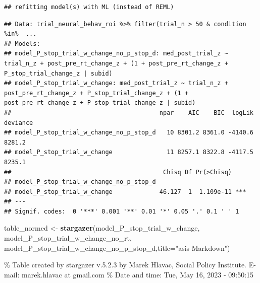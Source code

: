 \documentclass[
]{article}
\newenvironment{Shaded}{\begin{snugshade}}{\end{snugshade}}
\newcommand{\DataTypeTok}[1]{\textcolor[rgb]{0.13,0.29,0.53}{#1}}
\newcommand{\KeywordTok}[1]{\textcolor[rgb]{0.13,0.29,0.53}{\textbf{#1}}}
\newcommand{\NormalTok}[1]{#1}
\newcommand{\StringTok}[1]{\textcolor[rgb]{0.31,0.60,0.02}{#1}}
\begin{document}
\begin{verbatim}
## refitting model(s) with ML (instead of REML)
\end{verbatim}

\begin{verbatim}
## Data: trial_neural_behav_roi %>% filter(trial_n > 50 & condition %in%  ...
## Models:
## model_P_stop_trial_w_change_no_p_stop_d: med_post_trial_z ~ trial_n_z + post_pre_rt_change_z + (1 + post_pre_rt_change_z + P_stop_trial_change_z | subid)
## model_P_stop_trial_w_change: med_post_trial_z ~ trial_n_z + post_pre_rt_change_z + P_stop_trial_change_z + (1 + post_pre_rt_change_z + P_stop_trial_change_z | subid)
##                                         npar    AIC    BIC  logLik deviance
## model_P_stop_trial_w_change_no_p_stop_d   10 8301.2 8361.0 -4140.6   8281.2
## model_P_stop_trial_w_change               11 8257.1 8322.8 -4117.5   8235.1
##                                          Chisq Df Pr(>Chisq)    
## model_P_stop_trial_w_change_no_p_stop_d                         
## model_P_stop_trial_w_change             46.127  1  1.109e-11 ***
## ---
## Signif. codes:  0 '***' 0.001 '**' 0.01 '*' 0.05 '.' 0.1 ' ' 1
\end{verbatim}

\begin{Shaded}
\begin{Highlighting}[]
\NormalTok{table_normed <-}\StringTok{ }\KeywordTok{stargazer}\NormalTok{(model_P_stop_trial_w_change, model_P_stop_trial_w_change_no_rt, model_P_stop_trial_w_change_no_p_stop_d,}\DataTypeTok{title=}\StringTok{"asis Markdown"}\NormalTok{)}
\end{Highlighting}
\end{Shaded}

\% Table created by stargazer v.5.2.3 by Marek Hlavac, Social Policy
Institute. E-mail: marek.hlavac at gmail.com \% Date and time: Tue, May
16, 2023 - 09:50:15
\end{document}
